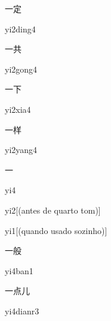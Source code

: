 \begin{verbete}[yi2ding4]{一定}
\begin{pronuncia}{yi2ding4}
\end{pronuncia}
\end{verbete}

\begin{verbete}[yi2gong4]{一共}
\begin{pronuncia}{yi2gong4}
\end{pronuncia}
\end{verbete}

\begin{verbete}[yi2xia4]{一下}
\begin{pronuncia}{yi2xia4}
\end{pronuncia}
\end{verbete}

\begin{verbete}[yi2yang4]{一样}
\begin{pronuncia}{yi2yang4}
\end{pronuncia}
\end{verbete}

\begin{verbete}[yi4]{一}
\begin{pronuncia}{yi4}
\end{pronuncia}
\begin{pronuncia}{yi2}[(antes de quarto tom)]
\end{pronuncia}
\begin{pronuncia}{yi1}[(quando usado sozinho)]
\end{pronuncia}
\end{verbete}

\begin{verbete}[yi4ban1]{一般}
\begin{pronuncia}{yi4ban1}
\end{pronuncia}
\end{verbete}

\begin{verbete}[yi4dianr3]{一点儿}
\begin{pronuncia}{yi4dianr3}
\end{pronuncia}
\end{verbete}

